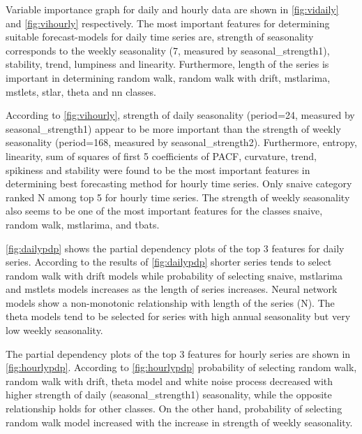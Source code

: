 \documentclass[11pt,a4paper,]{article}
\begin{document}
Variable importance graph for daily and hourly data are shown in
\autoref{fig:vidaily} and \autoref{fig:vihourly} respectively. The most
important features for determining suitable forecast-models for daily
time series are, strength of seasonality corresponds to the weekly
seasonality (7, measured by seasonal\_strength1), stability, trend,
lumpiness and linearity. Furthermore, length of the series is important
in determining random walk, random walk with drift, mstlarima, mstlets,
stlar, theta and nn classes.

According to \autoref{fig:vihourly}, strength of daily seasonality
(period=24, measured by seasonal\_strength1) appear to be more important
than the strength of weekly seasonality (period=168, measured by
seasonal\_strength2). Furthermore, entropy, linearity, sum of squares of
first 5 coefficients of PACF, curvature, trend, spikiness and stability
were found to be the most important features in determining best
forecasting method for hourly time series. Only snaive category ranked N
among top 5 for hourly time series. The strength of weekly seasonality
also seems to be one of the most important features for the classes
snaive, random walk, mstlarima, and tbats.

\autoref{fig:dailypdp} shows the partial dependency plots of the top 3
features for daily series. According to the results of
\autoref{fig:dailypdp} shorter series tends to select random walk with
drift models while probability of selecting snaive, mstlarima and
mstlets models increases as the length of series increases. Neural
network models show a non-monotonic relationship with length of the
series (N). The theta models tend to be selected for series with high
annual seasonality but very low weekly seasonality.

The partial dependency plots of the top 3 features for hourly series are
shown in \autoref{fig:hourlypdp}. According to \autoref{fig:hourlypdp}
probability of selecting random walk, random walk with drift, theta
model and white noise process decreased with higher strength of daily
(seasonal\_strength1) seasonality, while the opposite relationship holds
for other classes. On the other hand, probability of selecting random
walk model increased with the increase in strength of weekly
seasonality.
\end{document}
